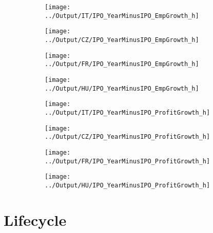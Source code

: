 \documentclass[12pt,notitlepage]{article}
\begin{document}
\begin{figure}[!htpb]
\centering
\caption{IPO and Employment growth (Haltiwanger)}
\begin{subfigure}{.49\textwidth}
    \centering
 \texttt{[image: ../Output/IT/IPO\_YearMinusIPO\_EmpGrowth\_h]}
\end{subfigure}%
\begin{subfigure}{.49\textwidth}
    \centering
 \texttt{[image: ../Output/CZ/IPO\_YearMinusIPO\_EmpGrowth\_h]}
\end{subfigure}
\begin{subfigure}{.49\textwidth}
    \centering
 \texttt{[image: ../Output/FR/IPO\_YearMinusIPO\_EmpGrowth\_h]}
\end{subfigure}%
\begin{subfigure}{.49\textwidth}
    \centering
 \texttt{[image: ../Output/HU/IPO\_YearMinusIPO\_EmpGrowth\_h]}
\end{subfigure}
\end{figure}
\pagebreak

\begin{figure}[!htpb]
\centering
\caption{IPO and Profits growth (Haltiwanger)}
\begin{subfigure}{.49\textwidth}
    \centering
 \texttt{[image: ../Output/IT/IPO\_YearMinusIPO\_ProfitGrowth\_h]}
\end{subfigure}%
\begin{subfigure}{.49\textwidth}
    \centering
 \texttt{[image: ../Output/CZ/IPO\_YearMinusIPO\_ProfitGrowth\_h]}
\end{subfigure}
\begin{subfigure}{.49\textwidth}
    \centering
 \texttt{[image: ../Output/FR/IPO\_YearMinusIPO\_ProfitGrowth\_h]}
\end{subfigure}%
\begin{subfigure}{.49\textwidth}
    \centering
 \texttt{[image: ../Output/HU/IPO\_YearMinusIPO\_ProfitGrowth\_h]}
\end{subfigure}
\end{figure}
\pagebreak



\FloatBarrier
\section{Lifecycle} %
\label{sec:lifecycle}
\FloatBarrier
\end{document}
